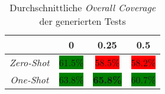 \bgroup
\def\arraystretch{2}
\begin{table}[H]
	\vspace{.5cm}
	\centering		
	\begin{center}
		\begin{tabular}{|c||c|c|c|}
			\hline 
			& 0 & 0.25 & 0.5 \\
			\hline 
			\hline
			\textit{Zero-Shot} & \colorbox{green}{61.5\%} & \colorbox{red}{58.5\%} & \colorbox{red}{58.2\%} \\
			\hline
			\textit{One-Shot} & \colorbox{green}{63.8\%} & \colorbox{green}{\textbf{65.8\%}} & \colorbox{green}{60.7\%} \\
			\hline
		\end{tabular} 
	\end{center}
	\caption{Durchschnittliche \textit{Overall Coverage} der generierten Tests}
	\label{fig:o-avg}
	\vspace{-.8cm}
\end{table}
\egroup
